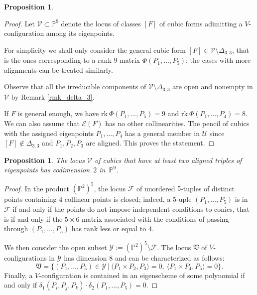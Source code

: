 \documentclass{amsart}
\theoremstyle{plain}
\newtheorem{prop}[lemma]{Proposition}
\theoremstyle{definition}
\newcommand{\p}{\mathbb{P}}
\newcommand{\sU}{\mathcal{U}}
\newcommand{\sV}{\mathcal{V}}
\newcommand{\sF}{\mathcal{F}}
\newcommand{\sY}{\mathcal{Y}}
\newcommand{\Eig}[1]{\mathcal{E}\!\left( {#1} \right)}
\newcommand{\rk}{\ensuremath{\mathrm{rk}}}
\begin{document}
{\begin{prop}
\end{prop}

\begin{proof}
Let $\sV \subset \p^9$ denote the locus of classes $[F]$ of cubic forms adimitting a $V$-configuration among its eigenpoints.

 For simplicity we shall only consider the general cubic form
 $[F] \in \sV \setminus \Delta_{3,3}$, that is the ones corresponding to a rank $9$ matrix $\Phi(P_1, \dots, P_5)$; the cases with more alignments can be treated similarly.

 Observe that all the irreducible components of $\sV \setminus \Delta_{3,3}$ are open and nonempty in $\sV$ by
 Remark \ref{rmk_delta_3}.

If $F$ is general enough, we have
$\rk \ \Phi(P_1, \dots, P_5)=9$ and $\rk \ \Phi(P_1, \dots, P_4)=8$.
We can also assume that $\Eig{F}$ has no other collinearities.
The pencil of cubics with the assigned eigenpoints $P_1, \dots, P_4$
has a general member in $\sU$ since $[F] \not\in \Delta_{3,3}$ and $P_1,P_2,P_3$ are aligned. This proves the statement.
\end{proof}

\begin{prop}
    The locus $\sV$ of cubics that have at least two aligned triples of eigenpoints has codimension~$2$ in~$\p^9$.
\end{prop}
\begin{proof}
In the product $(\p^2)^{5}$, the locus $\sF$ of
unordered $5$-tuples of distinct points containing $4$ collinear points is closed; indeed, a $5$-uple $(P_1,\dots,P_5)$ is in $\sF$ if and only if the points do not impose independent conditions to conics, that is if and only if the $5 \times 6$ matrix
associated with the
conditions of passing through $(P_1,\dots,P_5)$ has rank less or equal to $4$.

We then consider the open subset $\mathcal {Y}:=(\p^2)^{5} \setminus \sF$.
The locus $\mathfrak{V}$ of $V$-configurations in $\sY$ has dimension $8$ and can be characterized as follows:
$$
\mathfrak{V}= \{(P_1,\dots,P_5) \in \sY \ | \ \langle P_1 \times P_2, P_3\rangle=0, \ \langle P_1 \times P_4, P_5\rangle=0\}.
$$
Finally, a $V$-configuration is contained in an eigenscheme of some polynomial if and only if $\delta_1 (P_i,P_j,P_k) \cdot \delta_2 (P_1,\dots, P_5)=0$.




\end{proof}}
\end{document}
